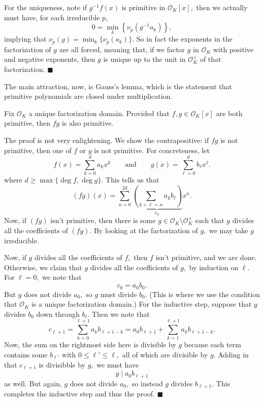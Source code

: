 For the uniqueness, note if $g^{-1}f(x)$ is primitive in $\mathcal O_K[x],$ then we actually must have, for each irreducible $p,$
\[0=\min_k\left\{\nu_p\left(g^{-1}a_k\right)\right\},\]
implying that $\nu_p(g)=\min_k\{\nu_p(a_k)\}.$ So in fact the exponents in the factorization of $g$ are all forced, meaning that, if we factor $g$ in $\mathcal O_K$ with positive and negative exponents, then $g$ is unique up to the unit in $\mathcal O_K^\times$ of that factorization. $\blacksquare$

The main attraction, now, is Gauss's lemma, which is the statement that primitive polynomials are closed under multiplication.
\begin{proposition}
    Fix $\mathcal O_K$ a unique factorization domain. Provided that $f,g\in\mathcal O_K[x]$ are both primitive, then $fg$ is also primitive.
\end{proposition}
The proof is not very enlightening. We show the contrapositive: if $fg$ is not primitive, then one of $f$ or $g$ is not primitive. For concreteness, let
\[f(x)=\sum_{k=0}^da_kx^k\qquad\text{and}\qquad g(x)=\sum_{\ell=0}^db_\ell x^\ell.\]
where $d\ge\max\{\deg f,\deg g\}.$ This tells us that
\[(fg)(x)=\sum_{n=0}^{2d}\underbrace{\left(\sum_{k+\ell=n}a_kb_\ell\right)}_{c_n}x^n.\]
Now, if $(fg)$ isn't primitive, then there is some $g\in\mathcal O_K\setminus\mathcal O_K^\times$ such that $g$ divides all the coefficients of $(fg).$ By looking at the factorization of $g,$ we may take $g$ irreducible.

Now, if $g$ divides all the coefficients of $f,$ then $f$ isn't primitive, and we are done. Otherwise, we claim that $g$ divides all the coefficients of $g,$ by induction on $\ell.$ For $\ell=0,$ we note that
\[c_0=a_0b_0.\]
But $g$ does not divide $a_0,$ so $g$ must divide $b_0.$ (This is where we use the condition that $\mathcal O_K$ is a unique factorization domain.) For the inductive step, suppose that $g$ divides $b_0$ down through $b_\ell.$ Then we note that
\[c_{\ell+1}=\sum_{k=0}^{\ell+1}a_kb_{\ell+1-k}=a_0b_{\ell+1}+\sum_{k=1}^{\ell+1} a_kb_{\ell+1-k}.\]
Now, the sum on the rightmost side here is divisible by $g$ because each term contains some $b_{\ell'}$ with $0\le\ell'\le\ell,$ all of which are divisible by $g.$ Adding in that $c_{\ell+1}$ is divisibble by $g,$ we must have
\[g\mid a_0b_{\ell+1}\]
as well. But again, $g$ does not divide $a_0,$ so instead $g$ divides $b_{\ell+1}.$ This completes the inductive step and thus the proof. $\blacksquare$

